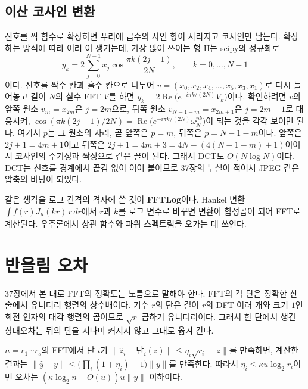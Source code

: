\subsection{이산 코사인 변환}

신호를 짝 함수로 확장하면 푸리에 급수의 사인 항이 사라지고 코사인만 남는다. 확장하는 방식에 따라 여러 이 생기는데, 가장 많이 쓰이는 형 II는 scipy의 정규화로
\[
y_k=2\sum_{j=0}^{N-1}x_j\cos\frac{\pi k(2j+1)}{2N},\qquad k=0,\dots,N-1
\]
이다\cite{ahmed1974dct}. 신호를 짝수 칸과 홀수 칸으로 나누어 $v=(x_0,x_2,x_4,\dots,x_5,x_3,x_1)$로 다시 늘어놓고 길이 $N$의 실수 FFT $V$를 하면 $y_k=2\operatorname{Re}\bigl(e^{-i\pi k/(2N)}V_k\bigr)$이다\cite{makhoul1980}. 확인하려면 $v$의 앞쪽 원소 $v_m=x_{2m}$은 $j=2m$으로, 뒤쪽 원소 $v_{N-1-m}=x_{2m+1}$은 $j=2m+1$로 대응시켜, $\cos(\pi k(2j+1)/2N)=\operatorname{Re}\bigl(e^{-i\pi k/(2N)}\omega_N^{pk}\bigr)$이 되는 것을 각각 보이면 된다. 여기서 $p$는 그 원소의 자리, 곧 앞쪽은 $p=m$, 뒤쪽은 $p=N-1-m$이다. 앞쪽은 $2j+1=4m+1$이고 뒤쪽은 $2j+1=4m+3=4N-(4(N-1-m)+1)$이어서 코사인의 주기성과 짝성으로 같은 꼴이 된다. 그래서 DCT도 $O(N\log N)$이다. DCT는 신호를 경계에서 끊김 없이 이어 붙이므로 37장의 누설이 적어서 JPEG 같은 압축의 바탕이 되었다.

같은 생각을 로그 간격의 격자에 쓴 것이 \textbf{FFTLog}이다. Hankel 변환 $\int f(r)J_\mu(kr)\,r\,dr$에서 $r$과 $k$를 로그 변수로 바꾸면 변환이 합성곱이 되어 FFT로 계산된다\cite{talman1978,hamilton2000fftlog}. 우주론에서 상관 함수와 파워 스펙트럼을 오가는 데 쓰인다.

\section{반올림 오차}
\label{sec:fft-error}

37장에서 본 대로 FFT의 정확도는 노름으로 말해야 한다. FFT의 각 단은 정확한 산술에서 유니터리 행렬의 상수배이다. 기수 $r$의 단은 길이 $r$의 DFT 여러 개와 크기 $1$인 회전 인자의 대각 행렬의 곱이므로 $\sqrt r$ 곱하기 유니터리이다. 그래서 한 단에서 생긴 상대오차는 뒤의 단을 지나며 커지지 않고 그대로 옮겨 간다.

\begin{proposition}
\label{prop:fft-error}
$n=r_1\cdots r_s$의 FFT에서 단 $i$가 $\|\hat z_i-\text{단}_i(z)\|\le\eta_i\sqrt{r_i}\,\|z\|$를 만족하면, 계산한 결과는 $\|\hat y-y\|\le\bigl(\prod_i(1+\eta_i)-1\bigr)\|y\|$를 만족한다. 따라서 $\eta_i\le\kappa u\log_2r_i$이면 오차는 $(\kappa\log_2n+O(u))u\|y\|$ 이하이다.
\end{proposition}

